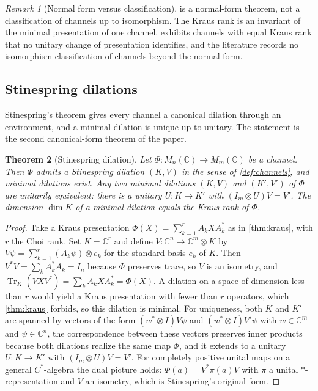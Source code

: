 \documentclass[11pt,letterpaper]{article}
\newtheorem{theorem}{Theorem}[section]
\theoremstyle{definition}
\theoremstyle{remark}
\newtheorem{remark}[theorem]{Remark}
\begin{document}
\begin{remark}[Normal form versus classification]
\label{rem:normalform}
 is a normal-form theorem, not a classification of channels up to isomorphism. The Kraus rank is an invariant of the minimal presentation of one channel.  exhibits channels with equal Kraus rank that no unitary change of presentation identifies, and the literature records no isomorphism classification of channels beyond the normal form.
\end{remark}

\subsection{Stinespring dilations}

Stinespring's theorem gives every channel a canonical dilation through an environment, and a minimal dilation is unique up to unitary. The statement is the second canonical-form theorem of the paper.

\begin{theorem}[Stinespring dilation]
\label{thm:stinespring}
Let $\Phi: M_n(\mathbb{C}) \to M_m(\mathbb{C})$ be a channel. Then $\Phi$ admits a Stinespring dilation $(K, V)$ in the sense of \cref{def:channels}, and minimal dilations exist. Any two minimal dilations $(K, V)$ and $(K', V')$ of $\Phi$ are unitarily equivalent: there is a unitary $U: K \to K'$ with $(I_m \otimes U) V = V'$. The dimension $\dim K$ of a minimal dilation equals the Kraus rank of $\Phi$.
\end{theorem}

\begin{proof}
Take a Kraus presentation $\Phi(X) = \sum_{k=1}^{r} A_k X A_k^*$ as in \cref{thm:kraus}, with $r$ the Choi rank. Set $K = \mathbb{C}^r$ and define $V: \mathbb{C}^n \to \mathbb{C}^m \otimes K$ by $V \psi = \sum_{k=1}^{r} (A_k \psi) \otimes e_k$ for the standard basis $e_k$ of $K$. Then $V^* V = \sum_k A_k^* A_k = I_n$ because $\Phi$ preserves trace, so $V$ is an isometry, and $\operatorname{Tr}_K(V X V^*) = \sum_k A_k X A_k^* = \Phi(X)$. A dilation on a space of dimension less than $r$ would yield a Kraus presentation with fewer than $r$ operators, which \cref{thm:kraus} forbids, so this dilation is minimal. For uniqueness, both $K$ and $K'$ are spanned by vectors of the form $(w^* \otimes I) V \psi$ and $(w^* \otimes I) V' \psi$ with $w \in \mathbb{C}^m$ and $\psi \in \mathbb{C}^n$, the correspondence between these vectors preserves inner products because both dilations realize the same map $\Phi$, and it extends to a unitary $U: K \to K'$ with $(I_m \otimes U) V = V'$. For completely positive unital maps on a general $C^*$-algebra the dual picture holds: $\Phi(a) = V^* \pi(a) V$ with $\pi$ a unital $*$-representation and $V$ an isometry, which is Stinespring's original form.
\end{proof}
\end{document}
